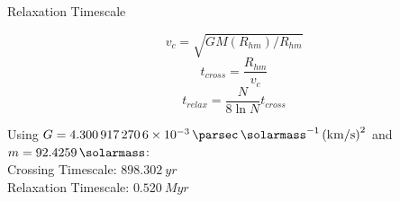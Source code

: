 \begin{frame}{Relaxation Timescale}


	\begin{equation}
		v_c = \sqrt{GM(R_{hm})/R_{hm}}
		\label{eq:circular-velocity}
	\end{equation}
	\begin{equation}
		t_{cross} = \frac{R_{hm}}{v_c}
		\label{eq:crossing_timescale}
	\end{equation}
	\begin{equation}
		t_{relax} = \frac{N}{8\ln{N}}t_{cross}
		\label{eq:relaxation_timescale}
	\end{equation}

	\bigskip

	Using $G = \SI{4.3009172706e-3}{\parsec.\solarmass^{-1}.(\kilo\metre\per\second)^2}$ and $m = \SI{92.4259}{\solarmass}$: \\

	Crossing Timescale: $898.302\ yr$ \\
	Relaxation Timescale: $0.520\ Myr$

\end{frame}


